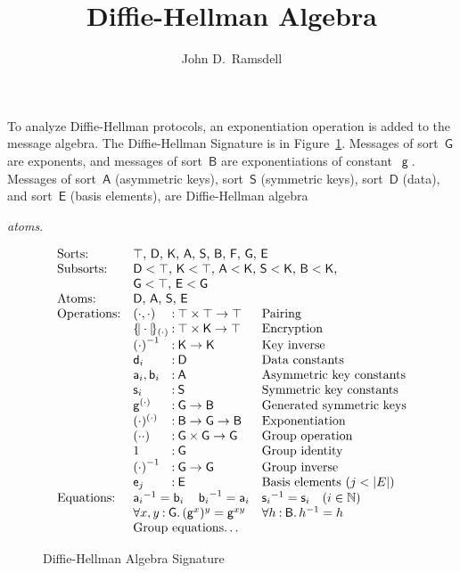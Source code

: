 \documentclass[12pt]{article}
\title{Diffie-Hellman Algebra}
\author{John D.\ Ramsdell}
\newif\ifbaseatoms
\newcommand{\cn}[1]{\ensuremath{\operatorname{\mathsf{#1}}}}
\newcommand{\srt}[1]{\ensuremath{\mathsf{#1}}}
\newcommand{\typ}{\mathbin:}
\newcommand{\enc}[2]{\ensuremath{\{\!|#1|\!\}_{#2}}}
\newcommand{\inv}[1]{{#1}^{-1}}
\newcommand{\nat}{\ensuremath{\mathbb{N}}}
\newcommand{\all}[1]{\forall#1\mathpunct.}
\begin{document}
\maketitle

To analyze Diffie-Hellman protocols, an exponentiation operation is
added to the message algebra.  The Diffie-Hellman Signature is in
Figure~\ref{fig:dh signature}.  Messages of sort~\srt{G} are
exponents, and messages of sort~\srt{B} are exponentiations of
constant~\cn{g}.  Messages of sort~$\srt{A}$ (asymmetric keys),
sort~$\srt{S}$ (symmetric keys), sort~$\srt{D}$ (data), and
sort~\srt{E} (basis elements), are Diffie-Hellman algebra
\ifbaseatoms
\emph{atoms}, along with messages of the form~$\cn{g}^x$ when~$x$ is a
variable of sort~\srt{E}.
\else
\emph{atoms}.
\fi

\begin{figure}
$$\begin{array}{ll@{{}\typ{}}ll}
\mbox{Sorts:}&
\multicolumn{3}{l}{\mbox{$\top$, $\srt{D}$, $\srt{K}$, $\srt{A}$, $\srt{S}$,
    $\srt{B}$, $\srt{F}$, $\srt{G}$, $\srt{E}$}}\\
\mbox{Subsorts:}&
\multicolumn{3}{l}{\mbox{$\srt{D}<\top$, $\srt{K}<\top$,
    $\srt{A}<\srt{K}$, $\srt{S}<\srt{K}$, $\srt{B}<\srt{K}$,}}\\
&\multicolumn{3}{l}{\mbox{$\srt{G}<\top$,
    $\srt{E}<\srt{G}$}}\\
\ifbaseatoms
\else
\mbox{Atoms:}&
\multicolumn{3}{l}{\mbox{\srt{D}, \srt{A}, \srt{S}, \srt{E}}}\\
\fi
\mbox{Operations:}&(\cdot,\cdot)&\top\times\top\to\top& \mbox{Pairing}\\
&\enc{\cdot}{(\cdot)}&\top\times\srt{K}\to\top&\mbox{Encryption}\\
&\inv{(\cdot)}&\srt{K}\to\srt{K}& \mbox{Key inverse}\\
&\cn{d}_i&\srt{D}& \mbox{Data constants}\\
&\cn{a}_i,\cn{b}_i&\srt{A}& \mbox{Asymmetric key constants}\\
&\cn{s}_i&\srt{S}& \mbox{Symmetric key constants}\\
&\cn{g}^{(\cdot)}&\srt{G}\to\srt{B}& \mbox{Generated symmetric keys}\\
&(\cdot)^{(\cdot)}&\srt{B}\to\srt{G}\to\srt{B}&\mbox{Exponentiation}\\
&(\cdot\cdot)&\srt{G}\times\srt{G}\to\srt{G}&\mbox{Group operation}\\
&1&\srt{G}&\mbox{Group identity}\\
&\inv{(\cdot)}&\srt{G}\to\srt{G}&\mbox{Group inverse}\\
&\cn{e}_j&\srt{E}&\mbox{Basis elements ($j<|E|$)}\\
\mbox{Equations:}&\multicolumn{2}{l}{\inv{\cn{a}_i}=\cn{b}_i\quad
\inv{\cn{b}_i}=\cn{a}_i}
&\inv{\cn{s}_i}=\cn{s}_i\quad(i\in\nat)\\
&\multicolumn{2}{l}{\all{x,y\typ\srt{G}}
(\cn{g}^x)^y=\cn{g}^{xy}}&\all{h\typ\srt{B}}\inv{h}=h\\
&\multicolumn{2}{l}{\mbox{Group equations\ldots}}
\end{array}$$
\caption{Diffie-Hellman Algebra Signature}\label{fig:dh signature}
\end{figure}
\end{document}
